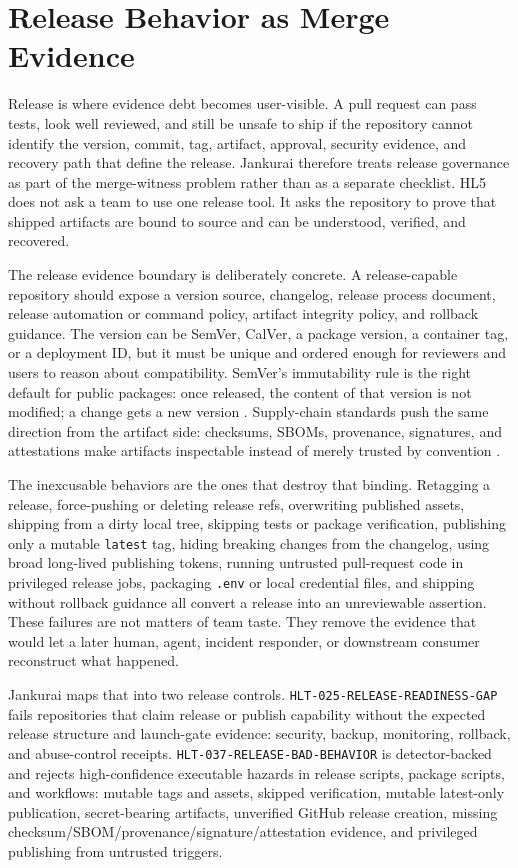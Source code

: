 \section{Release Behavior as Merge Evidence}

Release is where evidence debt becomes user-visible. A pull request can pass tests, look well reviewed, and still be unsafe to ship if the repository cannot identify the version, commit, tag, artifact, approval, security evidence, and recovery path that define the release. Jankurai therefore treats release governance as part of the merge-witness problem rather than as a separate checklist. HL5 does not ask a team to use one release tool. It asks the repository to prove that shipped artifacts are bound to source and can be understood, verified, and recovered.

The release evidence boundary is deliberately concrete. A release-capable repository should expose a version source, changelog, release process document, release automation or command policy, artifact integrity policy, and rollback guidance. The version can be SemVer, CalVer, a package version, a container tag, or a deployment ID, but it must be unique and ordered enough for reviewers and users to reason about compatibility. SemVer's immutability rule is the right default for public packages: once released, the content of that version is not modified; a change gets a new version \cite{semverSpec2026}. Supply-chain standards push the same direction from the artifact side: checksums, SBOMs, provenance, signatures, and attestations make artifacts inspectable instead of merely trusted by convention \cite{slsaSpec2026,spdxSpecifications2026}.

The inexcusable behaviors are the ones that destroy that binding. Retagging a release, force-pushing or deleting release refs, overwriting published assets, shipping from a dirty local tree, skipping tests or package verification, publishing only a mutable \texttt{latest} tag, hiding breaking changes from the changelog, using broad long-lived publishing tokens, running untrusted pull-request code in privileged release jobs, packaging \texttt{.env} or local credential files, and shipping without rollback guidance all convert a release into an unreviewable assertion. These failures are not matters of team taste. They remove the evidence that would let a later human, agent, incident responder, or downstream consumer reconstruct what happened.

Jankurai maps that into two release controls. \texttt{HLT-025-RELEASE-READINESS-GAP} fails repositories that claim release or publish capability without the expected release structure and launch-gate evidence: security, backup, monitoring, rollback, and abuse-control receipts. \texttt{HLT-037-RELEASE-BAD-BEHAVIOR} is detector-backed and rejects high-confidence executable hazards in release scripts, package scripts, and workflows: mutable tags and assets, skipped verification, mutable latest-only publication, secret-bearing artifacts, unverified GitHub release creation, missing checksum/SBOM/provenance/signature/attestation evidence, and privileged publishing from untrusted triggers.

